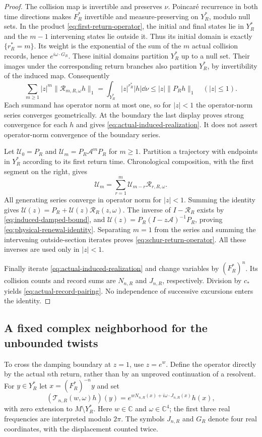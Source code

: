 \begin{proof}
The collision map is invertible and preserves $\nu$. Poincar\'e
recurrence in both time directions makes $F_R^*$ invertible and
measure-preserving on $Y_R^*$, modulo null sets. In the product
\eqref{eq:first-return-operator}, the initial and final states lie in
$Y_R^*$ and the $m-1$ intervening states lie outside it. Thus its initial
domain is exactly $\{r_R^*=m\}$. Its weight is the exponential of the
sum of the $m$ actual collision records, hence $e^{i\omega\cdot G_R}$.
These initial domains partition $Y_R^*$ up to a null set. Their images
under the corresponding return branches also partition $Y_R^*$, by
invertibility of the induced map. Consequently
\[
 \sum_{m\ge1}|z|^m\|\mathcal R_{m,R,\omega}h\|_1
       =\int_{Y_R^*}|z|^{r_R^*}|h|\dd\nu
       \le |z|\|P_Rh\|_1 \quad (|z|\le1).
\]
Each summand has operator norm at most one, so for $|z|<1$ the
operator-norm series converges geometrically. At the boundary the last
display proves strong convergence for each $h$ and gives
\eqref{eq:actual-induced-realization}. It does not assert operator-norm
convergence of the boundary series.

Let $\mathcal U_0=P_R$ and $\mathcal U_m=P_R\mathcal A^mP_R$ for
$m\ge1$. Partition a trajectory with endpoints in $Y_R^*$ according to
its first return time. Chronological composition, with the first segment
on the right, gives
\[
 \mathcal U_m=\sum_{r=1}^m\mathcal U_{m-r}\mathcal R_{r,R,\omega}.
\]
All generating series converge in operator norm for $|z|<1$. Summing
the identity gives $\mathcal U(z)=P_R+\mathcal U(z)\mathcal R_R(z,\omega)$.
The inverse of $I-\mathcal R_R$ exists by
\eqref{eq:induced-damped-bound}, and
$\mathcal U(z)=P_R(I-z\mathcal A)^{-1}P_R$, proving
\eqref{eq:physical-renewal-identity}. Separating $m=1$ from the series
and summing the intervening outside-section iterates proves
\eqref{eq:schur-return-operator}. All these inverses are used only in
$|z|<1$.

Finally iterate \eqref{eq:actual-induced-realization} and change
variables by $(F_R^*)^n$. Its collision counts and record sums are
$N_{n,R}$ and $J_{n,R}$, respectively. Division by $c_*$ yields
\eqref{eq:actual-record-pairing}. No independence of successive
excursions enters the identity.
\end{proof}

\subsection{A fixed complex neighborhood for the unbounded twists}
To cross the damping boundary at $z=1$, use $z=e^w$. Define the operator
directly by the actual $n$th return, rather than by an unproved
continuation of a resolvent. For $y\in Y_R^*$ let $x=(F_R^*)^{-n}y$ and set
\begin{equation}\label{eq:block-scale-operator}
 (\mathcal T_{n,R}(w,\omega)h)(y)
       =e^{wN_{n,R}(x)+i\omega\cdot J_{n,R}(x)}h(x),
\end{equation}
with zero extension to $M\setminus Y_R^*$. Here $w\in\mathbb C$ and
$\omega\in\mathbb C^4$; the first three real frequencies are interpreted
modulo $2\pi$. The symbols $J_{n,R}$ and $G_R$ denote four real
coordinates, with the displacement counted twice.

